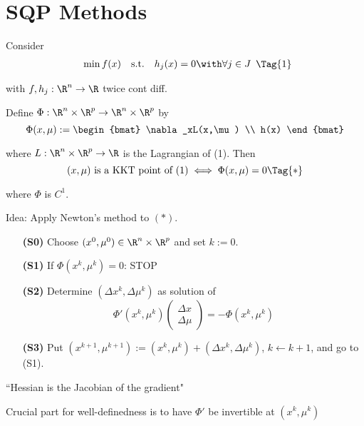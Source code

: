 
\section{SQP Methods}

Consider
\begin{equation*}
  \begin{array}{l l l}
    \min f(x) & \text{s.t.} & h_j(x)=0\with\forall j\in J
  \end{array}\Tag{1}
\end{equation*}

with $f,h_j:\R^n\to\R$ twice cont diff.

Define $\Phi:\R^n\times\R^p\to\R^n\times\R^p$ by
$$
  \Phi(x,\mu):=\begin{bmat}
    \nabla_xL(x,\mu) \\ h(x)
  \end{bmat}
$$

where $L:\R^n\times\R^p\to\R$ is the Lagrangian of (1). Then
\begin{equation*}
  (x,\mu)\text{ is a KKT point of (1)}\iff\Phi(x,\mu)=0\Tag{*}
\end{equation*}

where $\Phi$ is $C^1$.

Idea: Apply Newton's method to $(*)$.


\begin{enumerate}
  \item [\textbf{(S0)}] Choose $(x^0,\mu^0)\in\R^n\times\R^p$ and set $k:=0$.
  \item [\textbf{(S1)}] If $\Phi(x^k,\mu^k)=0$: STOP
  \item [\textbf{(S2)}] Determine $(\Delta x^k,\Delta\mu^k)$ as solution of
        $$
          \Phi'(x^k,\mu^k)\begin{pmatrix}\Delta x\\\Delta\mu\end{pmatrix}=-\Phi(x^k,\mu^k)
        $$
  \item [\textbf{(S3)}] Put $(x^{k+1},\mu^{k+1}):=(x^k,\mu^k)+(\Delta x^k,\Delta\mu^k)$, $k\gets k+1$, and go to (S1).
\end{enumerate}

``Hessian is the Jacobian of the gradient"

Crucial part for well-definedness is to have $\Phi'$ be invertible at
$(x^k,\mu^k)$


